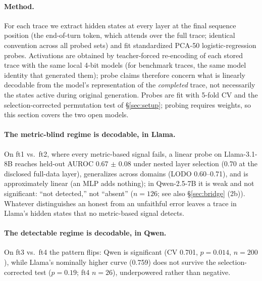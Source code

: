 \documentclass{article}
\begin{document}
\paragraph{Method.} For each trace we extract hidden states at every layer at the final sequence position (the end-of-turn token, which attends over the full trace; identical convention across all probed sets) and fit standardized PCA-50 logistic-regression probes. Activations are obtained by teacher-forced re-encoding of each stored trace with the same local 4-bit models (for benchmark traces, the same model identity that generated them); probe claims therefore concern what is linearly decodable from the model's representation of the \emph{completed} trace, not necessarily the states active during original generation. Probes are fit with 5-fold CV and the selection-corrected permutation test of \S\ref{sec:setup}; probing requires weights, so this section covers the two open models.


\paragraph{The metric-blind regime is decodable, in Llama.} On ft1 vs.\ ft2, where every metric-based signal fails, a linear probe on Llama-3.1-8B reaches held-out AUROC 0.67 $\pm$ 0.08 under nested layer selection (0.70 at the disclosed full-data layer), generalizes across domains (LODO 0.60--0.71), and is approximately linear (an MLP adds nothing); in Qwen-2.5-7B it is weak and not significant: ``not detected,'' not ``absent'' ($n{=}126$; see also \S\ref{sec:bridge} (2b)). Whatever distinguishes an honest from an unfaithful error leaves a trace in Llama's hidden states that no metric-based signal detects.

\paragraph{The detectable regime is decodable, in Qwen.} On ft3 vs.\ ft4 the pattern flips: Qwen is significant (CV 0.701, $p{=}0.014$, $n{=}200$), while Llama's nominally higher curve (0.759) does not survive the selection-corrected test ($p{=}0.19$; ft4 $n{=}26$), underpowered rather than negative.
\end{document}
